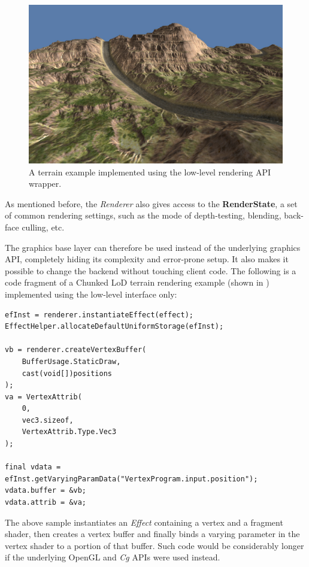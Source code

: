 \begin{figure}[ht!]
  \centering
    \includegraphics[width=0.9\linewidth]{./Figures/terrainRendering.jpg}
    \caption[terrainRendering]{A terrain example implemented using the low-level rendering API wrapper.}
  \label{fig:terrainRendering}
\end{figure}

As mentioned before, the \emph{Renderer} also gives access to the \textbf{RenderState}, a set of common rendering settings, such as the mode of depth-testing, blending, back-face culling, etc.

The graphics base layer can therefore be used instead of the underlying graphics API, completely hiding its complexity and error-prone setup. It also makes it possible to change the backend without touching client code. The following is a code fragment of a Chunked LoD \cite{chunkedLoD} terrain rendering example (shown in ) implemented using the low-level interface only:

\noindent\begin{minipage}{\textwidth}
\begin{lstlisting}[frame=single]
efInst = renderer.instantiateEffect(effect);
EffectHelper.allocateDefaultUniformStorage(efInst);

vb = renderer.createVertexBuffer(
	BufferUsage.StaticDraw,
	cast(void[])positions
);
va = VertexAttrib(
	0,
	vec3.sizeof,
	VertexAttrib.Type.Vec3
);

final vdata = efInst.getVaryingParamData("VertexProgram.input.position");
vdata.buffer = &vb;
vdata.attrib = &va;
\end{lstlisting}
\end{minipage}

The above sample instantiates an \emph{Effect} containing a vertex and a fragment shader, then creates a vertex buffer and finally binds a varying parameter in the vertex shader to a portion of that buffer. Such code would be considerably longer if the underlying OpenGL and \emph{Cg} APIs were used instead.
	
